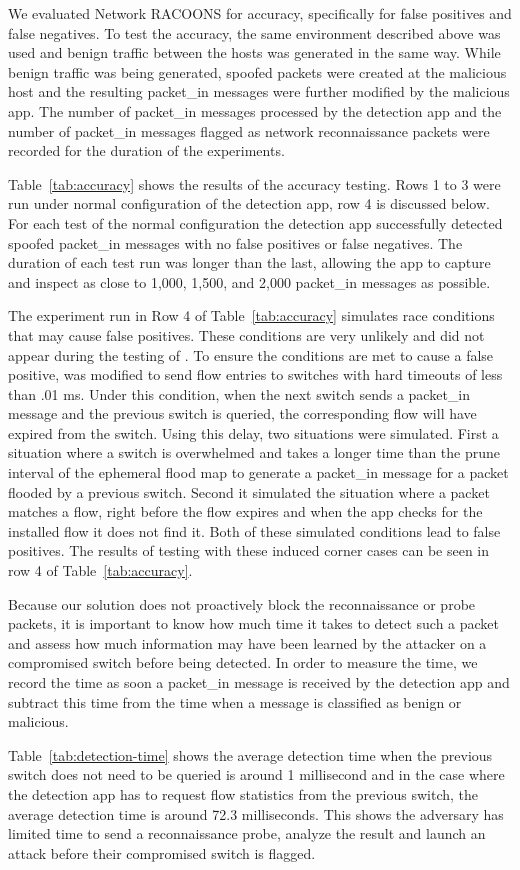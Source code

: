  We evaluated Network RACOONS for accuracy,
specifically for false positives and false negatives. To test the
accuracy, the same environment described above was used and benign 
traffic between the hosts was generated in the same way. While benign 
traffic was being generated, spoofed packets were created at the
malicious host and the resulting packet\_in messages were further
modified by the malicious app. The number of packet\_in messages 
processed by the detection app and the number of packet\_in messages 
flagged as network reconnaissance packets were recorded for the duration
of the experiments. 

Table~\ref{tab:accuracy} shows the results of the accuracy testing. Rows
1 to 3 were run under normal configuration of the detection app, row 4
is discussed below. For each test of the normal configuration the
detection app successfully detected spoofed packet\_in messages with no
false positives or false negatives. The duration of each test run was
longer than the last, allowing the app to capture and inspect as close
to 1,000, 1,500, and 2,000 packet\_in messages as possible.

The experiment run in Row 4 of Table~\ref{tab:accuracy} simulates race
conditions that may cause false positives. These conditions are very
unlikely and did not appear during the testing of \name. To ensure the
conditions are met to cause a false positive, \name was modified to send
flow entries to switches with hard timeouts of less than .01 ms. Under
this condition, when the next switch sends a packet\_in message and the 
previous switch is queried, the corresponding flow will have expired from
the switch. Using this delay, two situations were simulated. First a 
situation where a switch is overwhelmed and takes a longer time than the 
prune interval of the ephemeral flood map to generate a packet\_in message
for a packet flooded by a previous switch. Second it simulated the
situation where a packet matches a flow, right before the flow expires
and when the app checks for the installed flow it does not find it. Both 
of these simulated conditions lead to false positives. The results of 
testing with these induced corner cases can be seen in row 4 of 
Table~\ref{tab:accuracy}. 

 Because our solution does not proactively
block the reconnaissance or probe packets, it is important to know how
much time it takes to detect such a packet and assess how much
information may have been learned by the attacker on a compromised
switch before being detected. In order to measure the time, we record
the time as soon a packet\_in message is received by the detection app
and subtract this time from the time when a message is classified as
benign or malicious. 

Table~\ref{tab:detection-time} shows the average detection time when 
the previous switch does not need to be queried is around 1 millisecond
and in the case where the detection app has to request flow statistics 
from the previous switch, the average detection time is around 72.3 
milliseconds. This shows the adversary has limited time to send a
reconnaissance probe, analyze the result and launch an attack before
their compromised switch is flagged. 
